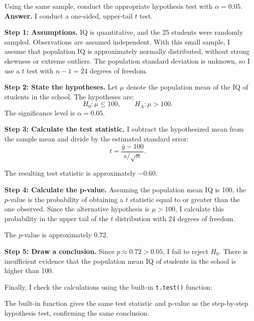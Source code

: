 \documentclass[12pt,letterpaper]{article}
\begin{document}
\begin{enumerate}
		\noindent Using the same sample, conduct the appropriate hypothesis test with $\alpha=0.05$.\\
		
		
		\textbf{Answer.} I conduct a one-sided, upper-tail $t$ test.
		
		\medskip
		\noindent\textbf{Step 1: Assumptions.}
		IQ is quantitative, and the 25 students were randomly sampled. Observations are assumed independent. With this small sample, I assume that population IQ is approximately normally distributed, without strong skewness or extreme outliers. The population standard deviation is unknown, so I use a $t$ test with $n-1=24$ degrees of freedom.
		
		\medskip
		\noindent\textbf{Step 2: State the hypotheses.}
		Let $\mu$ denote the population mean of the IQ of students in the school. The hypotheses are:
		\[
		H_0:\mu\leq100,\qquad H_A:\mu>100.
		\]
		The significance level is $\alpha=0.05$.
		
		\medskip
		\noindent\textbf{Step 3: Calculate the test statistic.}
		I subtract the hypothesized mean from the sample mean and divide by the estimated standard error:
		\[
		t=\frac{\bar{y}-100}{s/\sqrt{n}}.
		\]
		
		The resulting test statistic is approximately $-0.60$.
		
		\medskip
		\noindent\textbf{Step 4: Calculate the p-value.}
		Assuming the population mean IQ is 100, the $p$-value is the probability of obtaining a $t$ statistic equal to or greater than the one observed. Since the alternative hypothesis is $\mu>100$, I calculate this probability in the upper tail of the $t$ distribution with 24 degrees of freedom.
		
		The $p$-value is approximately $0.72$.
		
		\medskip
		\noindent\textbf{Step 5: Draw a conclusion.}
		Since $p\approx0.72>0.05$, I fail to reject $H_0$. There is insufficient evidence that the population mean IQ of students in the school is higher than 100.
		
		\medskip
		\noindent Finally, I check the calculations using the built-in \texttt{t.test()} function:
		
		
		The built-in function gives the same test statistic and p-value as the step-by-step hypothesis test, confirming the same conclusion.
		
	\end{enumerate}
	
\end{document}
